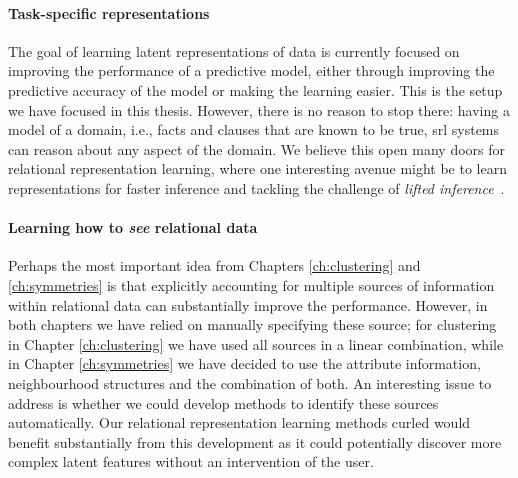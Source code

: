 \paragraph{Task-specific representations}
The goal of learning latent representations of data is currently focused on improving the performance of a predictive model, either through improving the predictive accuracy of the model or making the learning easier.
This is the setup we have focused in this thesis.
However, there is no reason to stop there: having a model of a domain, i.e., facts and clauses that are known to be true, \gls{srl} systems can reason about any aspect of the domain.
We believe this open many doors for relational representation learning, where one interesting avenue might be to learn representations for faster inference and tackling the challenge of \textit{lifted inference}~\cite{VdBThesis13,Poole:2003:FPI:1630659.1630801}.


\paragraph{Learning how to \textit{see} relational data}
Perhaps the most important idea from Chapters \ref{ch:clustering} and \ref{ch:symmetries} is that explicitly accounting for multiple sources of information within relational data can substantially improve the performance.
However, in both chapters we have relied on manually specifying these source; for clustering in Chapter \ref{ch:clustering} we have used all sources in a linear combination, while in Chapter \ref{ch:symmetries} we have decided to use the attribute information, neighbourhood structures and the combination of both.
An interesting issue to address is whether we could develop methods to identify these sources automatically.
Our relational representation learning methods \gls{curled} would benefit substantially from this development as it could potentially discover more complex latent features without an intervention of the user.







\cleardoublepage

